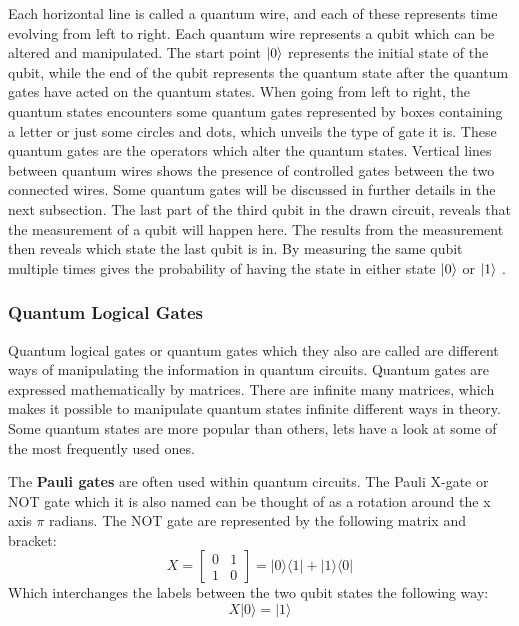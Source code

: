 \documentclass[../main.tex]{subfiles}
\begin{document}
Each horizontal line is called a quantum wire, and each of these represents time evolving from left to right. Each quantum wire represents a qubit which can be altered and manipulated. The start point \ensuremath{\ket{0}} represents the initial state of the qubit, while the end of the qubit represents the quantum state after the quantum gates have acted on the quantum states. When going from left to right, the quantum states encounters some quantum gates represented by boxes containing a letter or just some circles and dots, which unveils the type of gate it is. These quantum gates are the operators which alter the quantum states. Vertical lines between quantum wires shows the presence of controlled gates between the two connected wires. Some quantum gates will be discussed in further details in the next subsection. The last part of the third qubit in the drawn circuit, reveals that the measurement of a qubit will happen here. The results from the measurement then reveals which state the last qubit is in. By measuring the same qubit multiple times gives the probability of having the state in either state \ensuremath{\ket{0}} or \ensuremath{\ket{1}} \cite{cite_circuit_explained}.

\subsubsection{Quantum Logical Gates \cite{Qiskit_book}}
\label{sec:not}

Quantum logical gates or quantum gates which they also are called are different ways of manipulating the information in quantum circuits. Quantum gates are expressed mathematically by matrices. There are infinite many matrices, which makes it possible to manipulate quantum states infinite different ways in theory. Some quantum states are more popular than others, lets have a look at some of the most frequently used ones.

The \textbf{Pauli gates} are often used within quantum circuits. The Pauli X-gate or NOT gate which it is also named can be thought of as a rotation around the x axis \ensuremath{\pi} radians. The NOT gate are represented by the following matrix and bracket:
\begin{equation}
    X=\begin{bmatrix}
    0 & 1\\
    1 & 0
    \end{bmatrix}
    =|0\rangle\langle1|+|1\rangle\langle 0|
\end{equation}
Which interchanges the labels between the two qubit states the following way: 
\begin{equation}
    X|0\rangle=|1\rangle
\end{equation}
\end{document}
